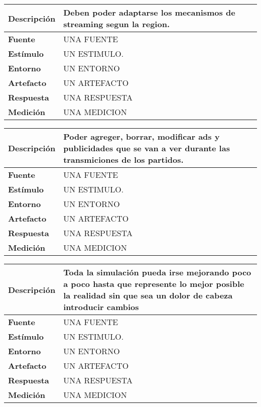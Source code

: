 \begin{center}
  \begin{tabular}{| l | p{10cm} | }
    \hline
  \textbf{Descripción} & Deben poder adaptarse los mecanismos de streaming segun la region. \\  \hline
  \textbf{Fuente} & UNA FUENTE\\  \hline
  \textbf{Estímulo} & UN ESTIMULO.\\  \hline
  \textbf{Entorno} & UN ENTORNO\\  \hline
  \textbf{Artefacto} & UN ARTEFACTO\\  \hline
  \textbf{Respuesta} & UNA RESPUESTA\\  \hline
  \textbf{Medición} & UNA MEDICION\\  \hline
  \end{tabular}
\end{center} 

\begin{center}
  \begin{tabular}{| l | p{10cm} | }
    \hline
  \textbf{Descripción} & Poder agreger, borrar, modificar ads y publicidades que se van a ver durante las transmiciones de los partidos.\\  \hline
  \textbf{Fuente} & UNA FUENTE\\  \hline
  \textbf{Estímulo} & UN ESTIMULO.\\  \hline
  \textbf{Entorno} & UN ENTORNO\\  \hline
  \textbf{Artefacto} & UN ARTEFACTO\\  \hline
  \textbf{Respuesta} & UNA RESPUESTA\\  \hline
  \textbf{Medición} & UNA MEDICION\\  \hline
  \end{tabular}
\end{center} 

\begin{center}
  \begin{tabular}{| l | p{10cm} | }
    \hline
  \textbf{Descripción} & Toda la simulación pueda irse mejorando poco a poco hasta que represente lo mejor posible la realidad sin que sea un dolor de cabeza introducir cambios\\  \hline
  \textbf{Fuente} & UNA FUENTE\\  \hline
  \textbf{Estímulo} & UN ESTIMULO.\\  \hline
  \textbf{Entorno} & UN ENTORNO\\  \hline
  \textbf{Artefacto} & UN ARTEFACTO\\  \hline
  \textbf{Respuesta} & UNA RESPUESTA\\  \hline
  \textbf{Medición} & UNA MEDICION\\  \hline
  \end{tabular}
\end{center} 

